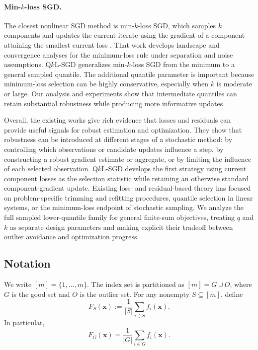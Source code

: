 \documentclass[11pt]{article}
\newcommand{\ve}[1]{\mathbf{#1}}
\begin{document}
\paragraph{Min-\(k\)-loss SGD.}
The closest nonlinear SGD method is min-\(k\)-loss SGD, which samples \(k\)
components and updates the current iterate using the gradient of a component
attaining the smallest current loss \citep{shah2020choosing}. That work develops landscape and convergence analyses for the minimum-loss rule under separation and noise assumptions.
Q\(k\)L-SGD generalizes min-\(k\)-loss SGD from the minimum to a general sampled
quantile. The additional quantile parameter is important because minimum-loss
selection can be highly conservative, especially when \(k\) is moderate or
large. Our analysis and experiments show that intermediate quantiles can
retain substantial robustness while producing more informative updates.


\bigskip

Overall, the existing works give rich evidence that losses and residuals can provide useful
signals for robust estimation and optimization. They show that robustness can be introduced at
different stages of a stochastic method: by controlling which observations or
candidate updates influence a step, by constructing a robust gradient estimate
or aggregate, or by limiting the influence of each selected observation.
Q\(k\)L-SGD develops the first strategy using current component losses as the
selection statistic while retaining an otherwise standard component-gradient
update. Existing loss- and residual-based theory has focused on
problem-specific trimming and refitting procedures, quantile selection in
linear systems, or the minimum-loss endpoint of stochastic sampling. We
analyze the full sampled lower-quantile family for general finite-sum
objectives, treating \(q\) and \(k\) as separate design parameters and making
explicit their tradeoff between outlier avoidance and optimization progress.


\subsection{Notation}

We write \([m]=\{1,\ldots,m\}\). The index set is partitioned as
\([m]=G\cup O\), where \(G\) is the good set and \(O\) is the outlier set. For
any nonempty \(S\subseteq[m]\), define
\[
F_S(\ve{x})
:=
\frac{1}{|S|}\sum_{i\in S}f_i(\ve{x}).
\]
In particular,
\[
F_G(\ve{x})
=
\frac{1}{|G|}\sum_{i\in G}f_i(\ve{x}).
\]
\end{document}
